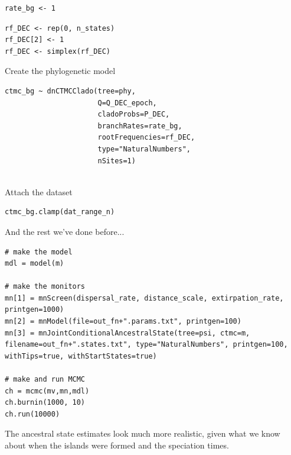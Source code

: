 \begin{snugshade}
\begin{lstlisting}
rate_bg <- 1
\end{lstlisting}
\end{snugshade}


\begin{snugshade}
\begin{lstlisting}
rf_DEC <- rep(0, n_states)
rf_DEC[2] <- 1
rf_DEC <- simplex(rf_DEC)
\end{lstlisting}
\end{snugshade}


Create the phylogenetic model
\begin{snugshade}
\begin{lstlisting}
ctmc_bg ~ dnCTMCClado(tree=phy,
                      Q=Q_DEC_epoch,
                      cladoProbs=P_DEC,
                      branchRates=rate_bg,
                      rootFrequencies=rf_DEC,
                      type="NaturalNumbers",
                      nSites=1)
                  
\end{lstlisting}
\end{snugshade}


Attach the dataset
\begin{snugshade}
\begin{lstlisting}
ctmc_bg.clamp(dat_range_n)
\end{lstlisting}
\end{snugshade}


And the rest we've done before...
\begin{snugshade}
\begin{lstlisting}
# make the model
mdl = model(m)

# make the monitors
mn[1] = mnScreen(dispersal_rate, distance_scale, extirpation_rate, printgen=1000)
mn[2] = mnModel(file=out_fn+".params.txt", printgen=100)
mn[3] = mnJointConditionalAncestralState(tree=psi, ctmc=m, filename=out_fn+".states.txt", type="NaturalNumbers", printgen=100, withTips=true, withStartStates=true)

# make and run MCMC
ch = mcmc(mv,mn,mdl)
ch.burnin(1000, 10)
ch.run(10000)
\end{lstlisting}
\end{snugshade}

The ancestral state estimates look much more realistic, given what we know about when the islands were formed and the speciation times.

